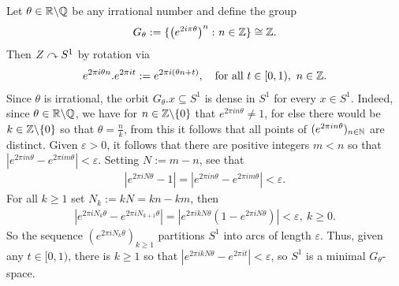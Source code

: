 \begin{example}\label{irat}
Let $\theta \in \mathbb{R} \backslash \mathbb{Q}$ be any irrational number and define the group 
\begin{align*}
G_{\theta}:=\{ \left(e^{2i \pi \theta}\right)^n \colon n \in \mathbb{Z} \} \cong \mathbb{Z}.
\end{align*} Then $Z \curvearrowright S^1$ by rotation via
\begin{align*}
e^{2 \pi i \theta n}. e^{2 \pi i t}:= e^{2 \pi i (\theta n + t)}, \quad \text{for all } t \in [0,1), \ n \in \mathbb{Z}.
\end{align*} Since $\theta$ is irrational, the orbit $G_{\theta}.x \subseteq S^1$ is dense in $S^1$ for every $x \in S^1$. Indeed, since $\theta \in \mathbb{R} \backslash \mathbb{Q}$, we have for $n \in \mathbb{Z} \backslash \{ 0 \}$ that $e^{2 \pi i n \theta} \neq 1$, for else there would be $k \in \mathbb{Z}\backslash\{0\}$ so that $\theta = \frac{n}{k}$, from this it follows that all points of $(e^{2 \pi i n \theta})_{n \in \mathbb{N}}$ are distinct. Given $\varepsilon>0$, it follows that there are positive integers $m< n$ so that $\left| e^{2 \pi i n \theta} - e^{2 \pi i m \theta}\right| < \varepsilon$. Setting $N:=m-n$, see that 
\begin{align*}
\left| e^{2 \pi i N \theta} - 1 \right| = \left|  e^{2 \pi i n \theta} - e^{2 \pi i m \theta}\right| < \varepsilon.
\end{align*}
For all $k \geq 1$ set $N_k:= k N = kn - km$, then
\begin{align*}
\left| e^{2 \pi i N_k \theta} - e^{2 \pi i N_{k+1} \theta} \right| = \left|  e^{2 \pi i kN\theta}\left(1 - e^{2 \pi i N \theta} \right)\right|<\varepsilon, \ k \geq 0.
\end{align*}
So the sequence $\left( e^{2 \pi i N_k \theta}\right)_{k \geq 1}$ partitions $S^1$ into arcs of length $\varepsilon$. Thus, given any $t \in [0,1)$, there is $k \geq 1$ so that $\left| e^{2 \pi i kN \theta} - e^{2 \pi i t}\right| < \varepsilon$, so $S^1$ is a minimal $G_{\theta}$-space.
\end{example}

